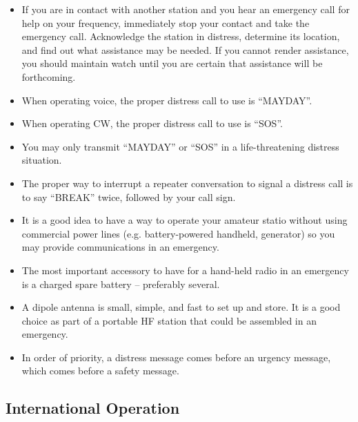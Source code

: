 \documentclass[letterpaper,12pt]{scrartcl}
\begin{document}
\begin{itemize}
\item If you are in contact with another station and you hear an emergency call for help on your frequency,
immediately stop your contact and take the emergency call. Acknowledge the station in distress, determine its location,
and find out what assistance may be needed. If you cannot render assistance, you should maintain watch until you are
certain that assistance will be forthcoming.
\item When operating voice, the proper distress call to use is ``MAYDAY''.
\item When operating CW, the proper distress call to use is ``SOS''.
\item You may only transmit ``MAYDAY'' or ``SOS'' in a life-threatening distress situation.
\item The proper way to interrupt a repeater conversation to signal a distress call is to say ``BREAK'' twice, followed by your call sign.
\item It is a good idea to have a way to operate your amateur statio without using commercial power lines
(e.g. battery-powered handheld, generator) so you may provide communications in an emergency.
\item The most important accessory to have for a hand-held radio in an emergency is a charged spare battery -- preferably several.
\item A dipole antenna is small, simple, and fast to set up and store. It is a good choice as part of a portable HF station that could be
assembled in an emergency.
\item In order of priority, a distress message comes before an urgency message, which comes before a safety message.
\end{itemize}

\subsection{International Operation}
\end{document}
